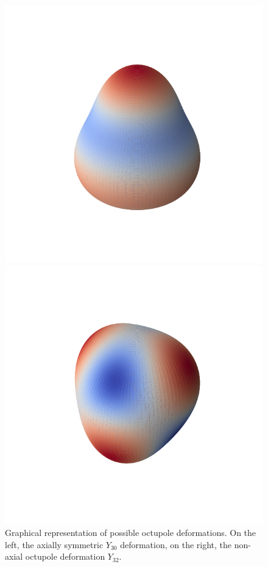 \begin{figure}[h]
    \centering
\begin{minipage}{0.48\textwidth}
    \centering
    \includegraphics[width=\textwidth]{Images/octupole_Y30}
  \end{minipage}
  \hfill
  \begin{minipage}{0.48\textwidth}
    \centering
    \includegraphics[width=\textwidth]{Images/octupole_Y32}
  \end{minipage}
    \caption{Graphical representation of possible octupole deformations. On the left, the axially symmetric $Y_{30}$ deformation, on the right, the non-axial octupole deformation $Y_{32}$.}
    \label{fig:octupole_defs}
\end{figure}




